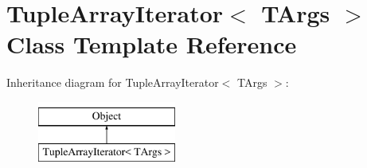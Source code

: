 \hypertarget{classTupleArrayIterator}{}\section{Tuple\+Array\+Iterator$<$ T\+Args $>$ Class Template Reference}
\label{classTupleArrayIterator}
Inheritance diagram for Tuple\+Array\+Iterator$<$ T\+Args $>$\+:\begin{figure}[H]
\begin{center}
\leavevmode
\includegraphics[height=2.000000cm]{classTupleArrayIterator}
\end{center}
\end{figure}
